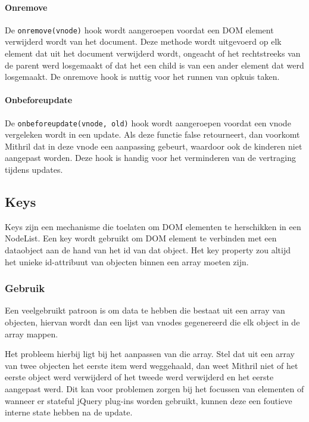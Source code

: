 \paragraph{Onremove}

De \texttt{onremove(vnode)} hook wordt aangeroepen voordat een DOM element verwijderd wordt van het document. Deze methode wordt uitgevoerd op elk element dat uit het document verwijderd wordt, ongeacht of het rechtstreeks van de parent werd losgemaakt of dat het een child is van een ander element dat werd losgemaakt. De onremove hook is nuttig voor het runnen van opkuis taken. \autocite{Mithril2019e}

\paragraph{Onbeforeupdate}

De \texttt{onbeforeupdate(vnode, old)} hook wordt aangeroepen voordat een vnode vergeleken wordt in een update. Als deze functie false retourneert, dan voorkomt Mithril dat in deze vnode een aanpassing gebeurt, waardoor ook de kinderen niet aangepast worden. Deze hook is handig voor het verminderen van de vertraging tijdens updates. \autocite{Mithril2019e}

\subsection{Keys}

Keys zijn een mechanisme die toelaten om DOM elementen te herschikken in een NodeList. Een key wordt gebruikt om DOM element te verbinden met een dataobject aan de hand van het id van dat object. Het key property zou altijd het unieke id-attribuut van objecten binnen een array moeten zijn. \autocite{Mithril2019d}

\subsubsection{Gebruik}

Een veelgebruikt patroon is om data te hebben die bestaat uit een array van objecten, hiervan wordt dan een lijst van vnodes gegenereerd die elk object in de array mappen. \autocite{Mithril2019d}

Het probleem hierbij ligt bij het aanpassen van die array. Stel dat uit een array van twee objecten het eerste item werd weggehaald, dan weet Mithril niet of het eerste object werd verwijderd of het tweede werd verwijderd en het eerste aangepast werd. Dit kan voor problemen zorgen bij het focussen van elementen of wanneer er stateful jQuery plug-ins worden gebruikt, kunnen deze een foutieve interne state hebben na de update. \autocite{Mithril2019d}


